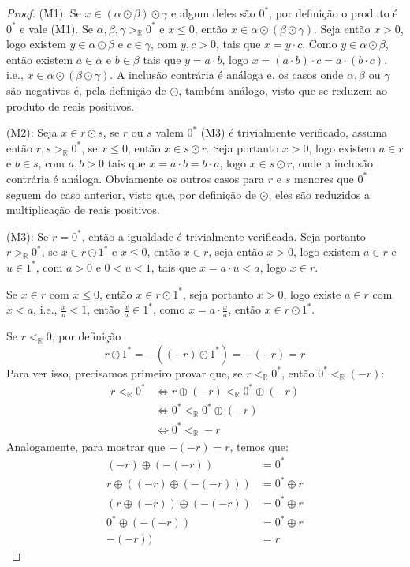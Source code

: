 \documentclass[11pt]{article}
\newcommand{\mbb}[1]{\mathbb{#1}}
\newcommand{\ltr}{<_\mbb{R}}
\newcommand{\gtr}{>_\mbb{R}}
\begin{document}
\begin{proof}
    (M1): Se $x\in(\alpha\odot\beta)\odot\gamma$ e algum deles são $0^*$, por definição o produto é $0^*$ e vale (M1). Se $\alpha,\beta,\gamma\gtr0^*$ e $x\leq0$, então $x\in\alpha\odot(\beta\odot\gamma)$. Seja então $x>0$, logo existem $y\in\alpha\odot\beta$ e $c\in\gamma$, com $y,c>0$, tais que $x=y\cdot c$. Como $y\in\alpha\odot\beta$, então existem $a\in\alpha$ e $b\in\beta$ tais que $y=a\cdot b$, logo $x=(a\cdot b)\cdot c=a\cdot(b\cdot c)$, i.e., $x\in\alpha\odot(\beta\odot\gamma)$. A inclusão contrária é análoga e, os casos onde $\alpha,\beta$ ou $\gamma$ são negativos é, pela definição de $\odot$, também análogo, visto que se reduzem ao produto de reais positivos.

    (M2): Seja $x\in r\odot s$, se $r$ ou $s$ valem $0^*$ (M3) é trivialmente verificado, assuma então $r,s\gtr0^*$, se $x\leq0$, então $x\in s \odot r$. Seja portanto $x>0$, logo existem $a\in r$ e $b\in s$, com $a,b>0$ tais que $x=a\cdot b=b\cdot a$, logo $x\in s \odot r$, onde a inclusão contrária é análoga. Obviamente os outros casos para $r$ e $s$ menores que $0^*$ seguem do caso anterior, visto que, por definição de $\odot$, eles são reduzidos a multiplicação de reais positivos.

    (M3): Se $r=0^*$, então a igualdade é trivialmente verificada. Seja portanto $r\gtr0^*$, se $x\in r\odot1^*$ e $x\leq0$, então $x\in r$, seja então $x>0$, logo existem $a\in r$ e $u\in 1^*$, com $a>0$ e $0<u<1$, tais que $x=a\cdot u<a$, logo $x\in r$.

    Se $x\in r$ com $x\leq0$, então $x\in r\odot1^*$, seja portanto $x>0$, logo existe $a\in r$ com $x<a$, i.e., $\frac{x}{a}<1$, então $\frac{x}{a}\in1^*$, como $x=a\cdot\frac{x}{a}$, então $x\in r\odot1^*$.

    Se $r\ltr0$, por definição
    $$r\odot1^*=-((-r)\odot1^*)=-(-r)=r$$
    Para ver isso, precisamos primeiro provar que, se $r\ltr0^*$, então $0^*\ltr(-r)$:
    \begin{align*}
        r\ltr0^* & \iff r \oplus (-r) \ltr 0^* \oplus (-r)\tag{O5}\\
        & \iff 0^* \ltr 0^* \oplus (-r)\tag{A4}\\
        & \iff 0^* \ltr -r\tag{A3}
    \end{align*}
    Analogamente, para mostrar que $-(-r)=r$, temos que:
    \begin{align*}
        (-r) \oplus (-(-r)) & = 0^*\tag{A4}\\
        r \oplus ((-r) \oplus (-(-r))) & = 0^* \oplus  r\\
        (r \oplus (-r)) \oplus (-(-r)) & = 0^* \oplus r\tag{A1}\\
        0^* \oplus (-(-r)) & = 0^* \oplus r\tag{A4}\\
        -(-r)) & = r\tag{A3}
    \end{align*}


\end{proof}
\end{document}
